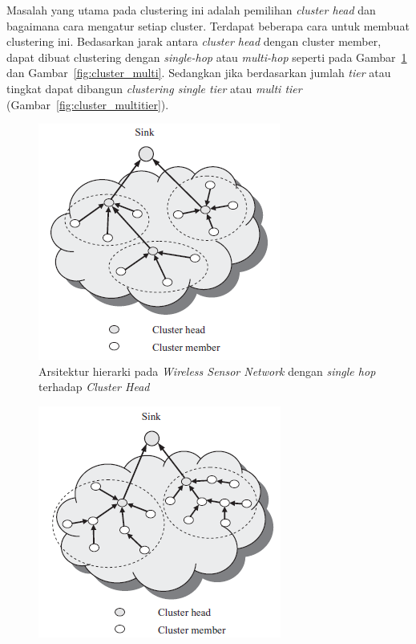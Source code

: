 \documentclass[a4paper,twoside]{article}
\begin{document}
\begin{enumerate}
\begin{itemize}
Masalah yang utama pada clustering ini adalah pemilihan \textit{cluster head} dan bagaimana cara mengatur setiap cluster. Terdapat beberapa cara untuk membuat clustering ini. Bedasarkan jarak antara \textit{cluster head} dengan cluster member, dapat dibuat clustering dengan \textit{single-hop} atau \textit{multi-hop} seperti pada Gambar~\ref{fig:cluster_single} dan Gambar~\ref{fig:cluster_multi}. Sedangkan jika berdasarkan jumlah \textit{tier} atau tingkat dapat dibangun \textit{clustering single tier} atau \textit{multi tier} (Gambar~\ref{fig:cluster_multitier}).
\begin{figure} [H]
	\centering  
	\includegraphics[scale=0.7]{Gambar/cluster_single}  
	\caption[Arsitektur hierarki pada \textit{Wireless Sensor Network} dengan \textit{single hop} terhadap \textit{Cluster Head}]{Arsitektur hierarki pada \textit{Wireless Sensor Network} dengan \textit{single hop} terhadap \textit{Cluster Head}} 
	\label{fig:cluster_single} 
\end{figure} 
\begin{figure} [H]
	\centering  
	\includegraphics[scale=0.7]{Gambar/cluster_multi}  

\end{figure}
\end{itemize}
\end{enumerate}
\end{document}
